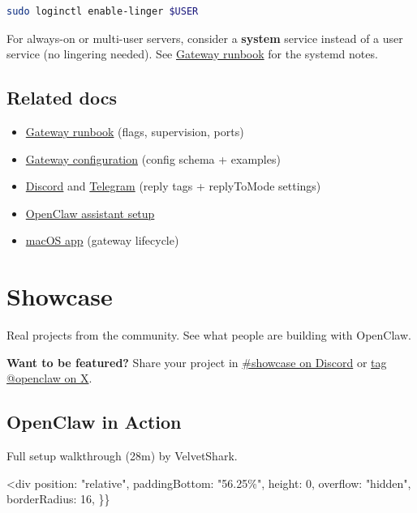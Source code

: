 \begin{lstlisting}[language=bash]
sudo loginctl enable-linger $USER
\end{lstlisting}


For always-on or multi-user servers, consider a \textbf{system} service instead of a
user service (no lingering needed). See \href{/gateway}{Gateway runbook} for the systemd notes.

\subsection{Related docs}


\begin{itemize}
  \item \href{/gateway}{Gateway runbook} (flags, supervision, ports)
  \item \href{/gateway/configuration}{Gateway configuration} (config schema + examples)
  \item \href{/channels/discord}{Discord} and \href{/channels/telegram}{Telegram} (reply tags + replyToMode settings)
  \item \href{/start/openclaw}{OpenClaw assistant setup}
  \item \href{/platforms/macos}{macOS app} (gateway lifecycle)
\end{itemize}



\clearpage

\section{Showcase}


Real projects from the community. See what people are building with OpenClaw.

\textbf{Want to be featured?} Share your project in \href{https://discord.gg/clawd}{\#showcase on Discord} or \href{https://x.com/openclaw}{tag @openclaw on X}.

\subsection{OpenClaw in Action}


Full setup walkthrough (28m) by VelvetShark.

<div
position: "relative",
paddingBottom: "56.25\%",
height: 0,
overflow: "hidden",
borderRadius: 16,
\}\}
\begin{quote}

\end{quote}

